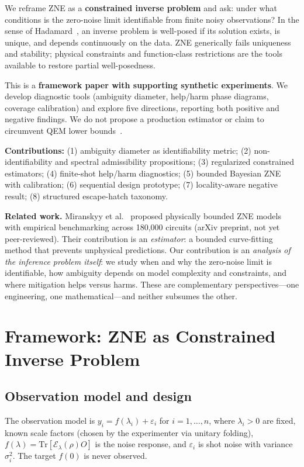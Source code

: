 \documentclass[aps,pra,twocolumn,superscriptaddress]{revtex4-2}
\begin{document}
We reframe ZNE as a \textbf{constrained inverse problem} and ask: under what conditions is the zero-noise limit identifiable from finite noisy observations?
In the sense of Hadamard~\cite{Hadamard1902}, an inverse problem is well-posed if its solution exists, is unique, and depends continuously on the data.
ZNE generically fails uniqueness and stability; physical constraints and function-class restrictions are the tools available to restore partial well-posedness.

This is a \textbf{framework paper with supporting synthetic experiments}.
We develop diagnostic tools (ambiguity diameter, help/harm phase diagrams, coverage calibration) and explore five directions, reporting both positive and negative findings.
We do not propose a production estimator or claim to circumvent QEM lower bounds~\cite{Takagi2022,Quek2024}.

\textbf{Contributions:}
(1) ambiguity diameter as identifiability metric;
(2) non-identifiability and spectral admissibility propositions;
(3) regularized constrained estimators;
(4) finite-shot help/harm diagnostics;
(5) bounded Bayesian ZNE with calibration;
(6) sequential design prototype;
(7) locality-aware negative result;
(8) structured escape-hatch taxonomy.

\textbf{Related work.}
Miranskyy et al.~\cite{Miranskyy2026} proposed physically bounded ZNE models with empirical benchmarking across 180,000 circuits (arXiv preprint, not yet peer-reviewed).
Their contribution is an \emph{estimator}: a bounded curve-fitting method that prevents unphysical predictions.
Our contribution is an \emph{analysis of the inference problem itself}: we study when and why the zero-noise limit is identifiable, how ambiguity depends on model complexity and constraints, and where mitigation helps versus harms.
These are complementary perspectives---one engineering, one mathematical---and neither subsumes the other.

\section{Framework: ZNE as Constrained Inverse Problem}
\label{sec:inverse}

\subsection{Observation model and design}

The observation model is $y_i = f(\lambda_i) + \varepsilon_i$ for $i=1,\ldots,n$, where $\lambda_i > 0$ are fixed, known scale factors (chosen by the experimenter via unitary folding), $f(\lambda) = \mathrm{Tr}[\mathcal{E}_\lambda(\rho) O]$ is the noise response, and $\varepsilon_i$ is shot noise with variance $\sigma_i^2$.
The target $f(0)$ is never observed.
\end{document}
